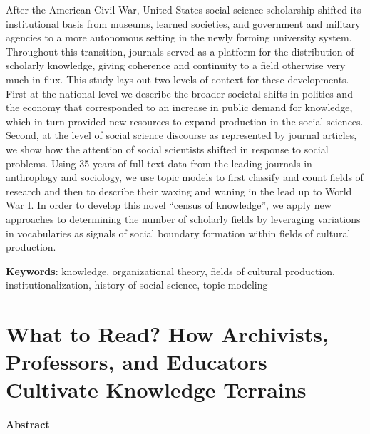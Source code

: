 \documentclass[]{book}
\theoremstyle{definition}
\theoremstyle{definition}
\theoremstyle{definition}
\theoremstyle{remark}
\begin{document}
After the American Civil War, United States social science
scholarship shifted its institutional basis from museums, learned
societies, and government and military agencies to a more autonomous
setting in the newly forming university system. Throughout this
transition, journals served as a platform for the distribution of
scholarly knowledge, giving coherence and continuity to a field
otherwise very much in flux. This study lays out two levels of context
for these developments. First at the national level we describe the
broader societal shifts in politics and the economy that corresponded to
an increase in public demand for knowledge, which in turn provided new
resources to expand production in the social sciences. Second, at the
level of social science discourse as represented by journal articles, we
show how the attention of social scientists shifted in response to
social problems. Using 35 years of full text data from the leading
journals in anthroplogy and sociology, we use topic models to first
classify and count fields of research and then to describe their waxing
and waning in the lead up to World War I. In order to develop this novel
``census of knowledge'', we apply new approaches to determining the
number of scholarly fields by leveraging variations in vocabularies as
signals of social boundary formation within fields of cultural
production.





\textbf{Keywords}: knowledge, organizational theory, fields of cultural
production, institutionalization, history of social science, topic
modeling

\hypertarget{int}{%
\chapter{What to Read? How Archivists, Professors, and Educators
Cultivate Knowledge Terrains}\label{int}}

\hypertarget{abstract}{%
\subsubsection*{Abstract}\label{abstract}}
\end{document}
